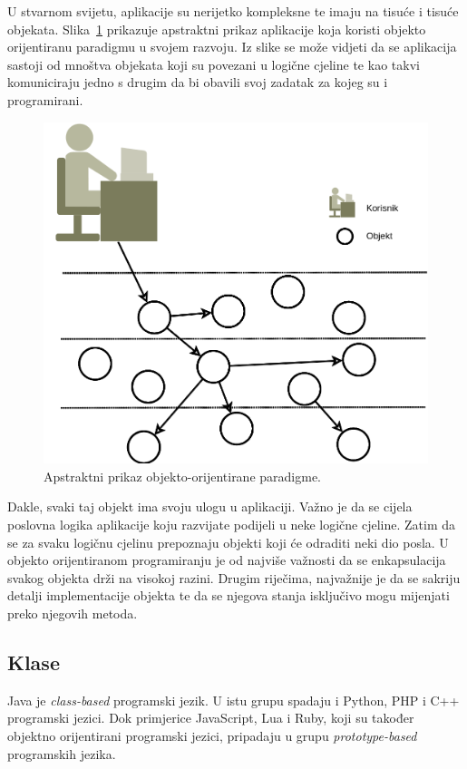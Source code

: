 U stvarnom svijetu, aplikacije su nerijetko kompleksne te imaju na tisuće i tisuće objekata. Slika~\ref{fig:oop_system_abstract_overview} prikazuje apstraktni prikaz aplikacije koja koristi objekto orijentiranu paradigmu u svojem razvoju. Iz slike se može vidjeti da se aplikacija sastoji od mnoštva objekata koji su povezani u logične cjeline te kao takvi komuniciraju jedno s drugim da bi obavili svoj zadatak za kojeg su i programirani.

\begin{figure}[!htb]
    \caption{Apstraktni prikaz objekto-orijentirane paradigme.}
    \label{fig:oop_system_abstract_overview}
    \centering
    \includegraphics[scale=0.4]{images/oop_system_abstract_overview.png}
\end{figure}

Dakle, svaki taj objekt ima svoju ulogu u aplikaciji. Važno je da se cijela poslovna logika aplikacije koju razvijate podijeli u neke logične cjeline. Zatim da se za svaku logičnu cjelinu prepoznaju objekti koji će odraditi neki dio posla. U objekto orijentiranom programiranju je od najviše važnosti da se enkapsulacija svakog objekta drži na visokoj razini. Drugim riječima, najvažnije je da se sakriju detalji implementacije objekta te da se njegova stanja isključivo mogu mijenjati preko njegovih metoda.

\subsection{Klase}
Java je \emph{class-based} \cite{classbasedprogramming} programski jezik. U istu grupu spadaju i Python, PHP i C++ programski jezici. Dok primjerice JavaScript, Lua i Ruby, koji su također objektno orijentirani programski jezici, pripadaju u grupu \emph{prototype-based} \cite{prototypebasedprogramming} programskih jezika.

